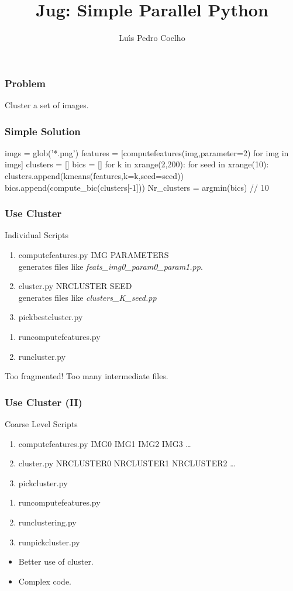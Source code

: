 \documentclass{beamer}
\title{Jug: Simple Parallel Python}
\author{Lu\'\i{}s Pedro Coelho}
\institute{Joint \textsc{cmu}-Pitt PhD.\ in Computational Biology}
\begin{document}
\frame{\titlepage}
\begin{frame}[fragile]
\frametitle{Problem}
Cluster a set of images.
\end{frame}

\begin{frame}[fragile]
\frametitle{Simple Solution}

\begin{python}
imgs = glob('*.png')
features = [computefeatures(img,parameter=2)
                for img in imgs]
clusters = []
bics = []
for k in xrange(2,200):
    for seed in xrange(10):
        clusters.append(kmeans(features,k=k,seed=seed))
        bics.append(compute_bic(clusters[-1]))
Nr_clusters = argmin(bics) // 10
\end{python}
\end{frame}

\begin{frame}[fragile]
\frametitle{Use Cluster}

\begin{block}{Individual Scripts}
\begin{enumerate}
\item computefeatures.py IMG PARAMETERS\\
    generates files like \textit{feats_img0_param0_param1.pp}.
\item cluster.py NRCLUSTER SEED\\
    generates files like \textit{clusters_K_seed.pp}
\item pickbestcluster.py
\end{enumerate}
\pause
\begin{enumerate}
\item runcomputefeatures.py
\item runcluster.py
\end{enumerate}
\end{block}

Too fragmented! Too many intermediate files.
\end{frame}

\begin{frame}[fragile]
\frametitle{Use Cluster (II)}
\begin{block}{Coarse Level Scripts}
\begin{enumerate}
\item computefeatures.py IMG0 IMG1 IMG2 IMG3 \dots
\item cluster.py NRCLUSTER0 NRCLUSTER1 NRCLUSTER2 \dots
\item pickcluster.py
\end{enumerate}
\pause
\begin{enumerate}
\item runcomputefeatures.py
\item runclustering.py
\item runpickcluster.py
\end{enumerate}
\end{block}

\pause
\begin{itemize}
\item Better use of cluster.
\item Complex code.
\end{itemize}
\end{frame}
\end{document}
